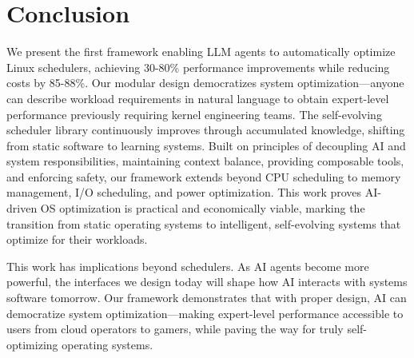 \section{Conclusion}

We present the first framework enabling LLM agents to automatically optimize Linux schedulers, achieving 30-80\% performance improvements while reducing costs by 85-88\%. Our modular design democratizes system optimization—anyone can describe workload requirements in natural language to obtain expert-level performance previously requiring kernel engineering teams. The self-evolving scheduler library continuously improves through accumulated knowledge, shifting from static software to learning systems. Built on principles of decoupling AI and system responsibilities, maintaining context balance, providing composable tools, and enforcing safety, our framework extends beyond CPU scheduling to memory management, I/O scheduling, and power optimization. This work proves AI-driven OS optimization is practical and economically viable, marking the transition from static operating systems to intelligent, self-evolving systems that optimize for their workloads.

This work has implications beyond schedulers. As AI agents become more powerful, the interfaces we design today will shape how AI interacts with systems software tomorrow. Our framework demonstrates that with proper design, AI can democratize system optimization—making expert-level performance accessible to users from cloud operators to gamers, while paving the way for truly self-optimizing operating systems.